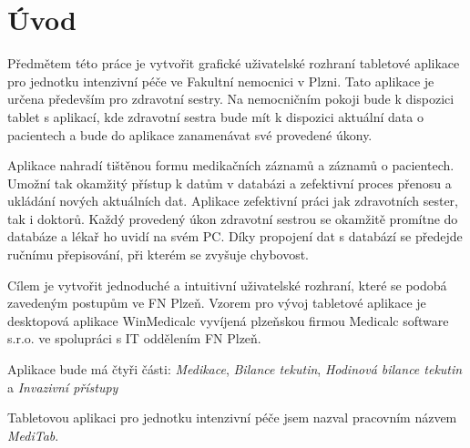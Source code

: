 \setlength{\parskip}{1em}

\chapter*{Úvod}

Předmětem této práce je vytvořit grafické uživatelské rozhraní tabletové aplikace pro jednotku intenzivní péče ve Fakultní nemocnici v Plzni. Tato aplikace je určena především pro zdravotní sestry. Na nemocničním pokoji bude k dispozici tablet s aplikací, kde zdravotní sestra bude mít k dispozici aktuální data o pacientech a bude do aplikace zanamenávat své provedené úkony.

Aplikace nahradí tištěnou formu medikačních záznamů a záznamů o pacientech. Umožní tak okamžitý přístup k datům v databázi a zefektivní proces přenosu a ukládání nových aktuálních dat. Aplikace zefektivní práci jak zdravotních sester, tak i doktorů. Každý provedený úkon zdravotní sestrou se okamžitě promítne do databáze a lékař ho uvidí na svém PC. Díky propojení dat s databází se předejde ručnímu přepisování, při kterém se zvyšuje chybovost.

Cílem je vytvořit jednoduché a intuitivní uživatelské rozhraní, které se podobá zavedeným postupům ve FN Plzeň. Vzorem pro vývoj tabletové aplikace je desktopová aplikace WinMedicalc vyvíjená plzeňskou firmou Medicalc software s.r.o. ve spolupráci s IT oddělením FN Plzeň.

Aplikace bude má čtyři části: \emph{Medikace}, \emph{Bilance tekutin}, \emph{Hodinová bilance tekutin} a \emph{Invazivní přístupy}

Tabletovou aplikaci pro jednotku intenzivní péče jsem nazval pracovním názvem \emph{MediTab}.